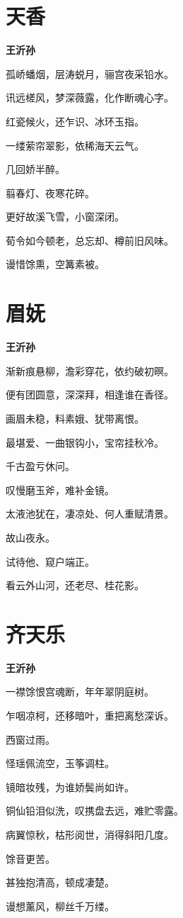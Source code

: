 \documentclass[12pt,a4paper]{ctexbook}
\begin{document}
\section{天香}
\textbf{王沂孙}\par\vspace{0.5em}
孤峤蟠烟，层涛蜕月，骊宫夜采铅水。\par
讯远槎风，梦深薇露，化作断魂心字。\par
红瓷候火，还乍识、冰环玉指。\par
一缕萦帘翠影，依稀海天云气。\par
几回娇半醉。\par
翦春灯、夜寒花碎。\par
更好故溪飞雪，小窗深闭。\par
荀令如今顿老，总忘却、樽前旧风味。\par
谩惜馀熏，空篝素被。\par

\section{眉妩}
\textbf{王沂孙}\par\vspace{0.5em}
渐新痕悬柳，澹彩穿花，依约破初暝。\par
便有团圆意，深深拜，相逢谁在香径。\par
画眉未稳，料素娥、犹带离恨。\par
最堪爱、一曲银钩小，宝帘挂秋冷。\par
千古盈亏休问。\par
叹慢磨玉斧，难补金镜。\par
太液池犹在，凄凉处、何人重赋清景。\par
故山夜永。\par
试待他、窥户端正。\par
看云外山河，还老尽、桂花影。\par

\section{齐天乐}
\textbf{王沂孙}\par\vspace{0.5em}
一襟馀恨宫魂断，年年翠阴庭树。\par
乍咽凉柯，还移暗叶，重把离愁深诉。\par
西窗过雨。\par
怪瑶佩流空，玉筝调柱。\par
镜暗妆残，为谁娇鬓尚如许。\par
铜仙铅泪似洗，叹携盘去远，难贮零露。\par
病翼惊秋，枯形阅世，消得斜阳几度。\par
馀音更苦。\par
甚独抱清高，顿成凄楚。\par
谩想薰风，柳丝千万缕。\par
\end{document}
